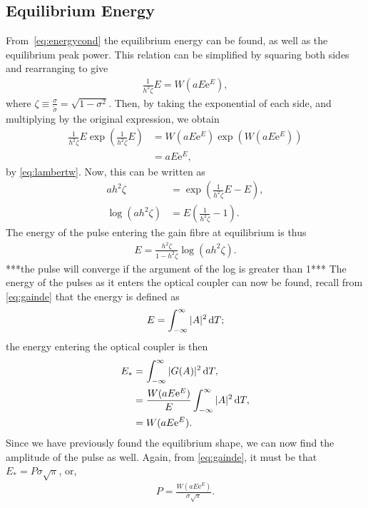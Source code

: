\subsection{Equilibrium Energy}
From~\eqref{eq:energycond} the equilibrium energy can be found, as well as the equilibrium peak power. This relation can be simplified by squaring both sides and rearranging to give
\begin{align*}
\frac{1}{h^2 \zeta} E = W \left( a E \textrm{e}^E \right),
\end{align*}
where $\displaystyle \zeta \equiv \frac{\sigma}{\widetilde{\sigma}} = \sqrt{1 - \sigma^2}$. Then, by taking the exponential of each side, and multiplying by the original expression, we obtain
\begin{align*}
\frac{1}{h^2 \zeta} E \exp \left(\frac{1}{h^2 \zeta} E \right) &= W \left( a E \textrm{e}^E \right) \exp \left( W \left( a E \textrm{e}^E \right) \right) \\
&= a E \textrm{e}^E,
\end{align*}
by \eqref{eq:lambertw}. Now, this can be written as 
\begin{align*}
a h^2 \zeta &= \exp \left( \frac{1}{h^2 \zeta}E - E \right), \\
\log \left( a h^2 \zeta \right) &= E \left( \frac{1}{h^2 \zeta} - 1 \right).
\end{align*}
The energy of the pulse entering the gain fibre at equilibrium is thus
\begin{align*}
E = \frac{h^2 \zeta}{1 - h^2 \zeta} \log \left( a h^2 \zeta \right).
\end{align*}
***the pulse will converge if the argument of the log is greater than 1***
The energy of the pulses as it enters the optical coupler can now be found, recall from \eqref{eq:gainde} that the energy is defined as
\begin{align*}
E = \int_{-\infty}^\infty |A|^2 \, \textrm{d} T;
\end{align*}
the energy entering the optical coupler is then
\begin{align}
\nonumber E_* &= \int_{-\infty}^\infty |G(A)|^2 \, \textrm{d} T, \\
\nonumber &= \frac{W(a E \textrm{e}^E)}{E} \int_{-\infty}^\infty |A|^2 \, \textrm{d} T, \\
&= W(a E \textrm{e}^E).
\end{align}
Since we have previously found the equilibrium shape, we can now find the amplitude of the pulse as well. Again, from \eqref{eq:gainde}, it must be that $E_* = P \sigma \sqrt{\pi}$, or,
\begin{align}
P = \frac{W(a E \textrm{e}^E)}{\sigma \sqrt{\pi}}.
\end{align}
